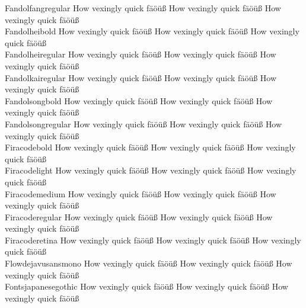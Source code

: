 \begin{tabbing}
Fandolfangregular \> {\mktsStyleNormal{}How vexingly quick fäöüß} {\mktsFontfileFandolfangregular{}How vexingly quick fäöüß} {\mktsStyleItalic{}How vexingly quick fäöüß} \\
Fandolheibold \> {\mktsStyleNormal{}How vexingly quick fäöüß} {\mktsFontfileFandolheibold{}How vexingly quick fäöüß} {\mktsStyleItalic{}How vexingly quick fäöüß} \\
Fandolheiregular \> {\mktsStyleNormal{}How vexingly quick fäöüß} {\mktsFontfileFandolheiregular{}How vexingly quick fäöüß} {\mktsStyleItalic{}How vexingly quick fäöüß} \\
Fandolkairegular \> {\mktsStyleNormal{}How vexingly quick fäöüß} {\mktsFontfileFandolkairegular{}How vexingly quick fäöüß} {\mktsStyleItalic{}How vexingly quick fäöüß} \\
Fandolsongbold \> {\mktsStyleNormal{}How vexingly quick fäöüß} {\mktsFontfileFandolsongbold{}How vexingly quick fäöüß} {\mktsStyleItalic{}How vexingly quick fäöüß} \\
Fandolsongregular \> {\mktsStyleNormal{}How vexingly quick fäöüß} {\mktsFontfileFandolsongregular{}How vexingly quick fäöüß} {\mktsStyleItalic{}How vexingly quick fäöüß} \\
Firacodebold \> {\mktsStyleNormal{}How vexingly quick fäöüß} {\mktsFontfileFiracodebold{}How vexingly quick fäöüß} {\mktsStyleItalic{}How vexingly quick fäöüß} \\
Firacodelight \> {\mktsStyleNormal{}How vexingly quick fäöüß} {\mktsFontfileFiracodelight{}How vexingly quick fäöüß} {\mktsStyleItalic{}How vexingly quick fäöüß} \\
Firacodemedium \> {\mktsStyleNormal{}How vexingly quick fäöüß} {\mktsFontfileFiracodemedium{}How vexingly quick fäöüß} {\mktsStyleItalic{}How vexingly quick fäöüß} \\
Firacoderegular \> {\mktsStyleNormal{}How vexingly quick fäöüß} {\mktsFontfileFiracoderegular{}How vexingly quick fäöüß} {\mktsStyleItalic{}How vexingly quick fäöüß} \\
Firacoderetina \> {\mktsStyleNormal{}How vexingly quick fäöüß} {\mktsFontfileFiracoderetina{}How vexingly quick fäöüß} {\mktsStyleItalic{}How vexingly quick fäöüß} \\
Flowdejavusansmono \> {\mktsStyleNormal{}How vexingly quick fäöüß} {\mktsFontfileFlowdejavusansmono{}How vexingly quick fäöüß} {\mktsStyleItalic{}How vexingly quick fäöüß} \\
Fontsjapanesegothic \> {\mktsStyleNormal{}How vexingly quick fäöüß} {\mktsFontfileFontsjapanesegothic{}How vexingly quick fäöüß} {\mktsStyleItalic{}How vexingly quick fäöüß} \\

\end{tabbing}
